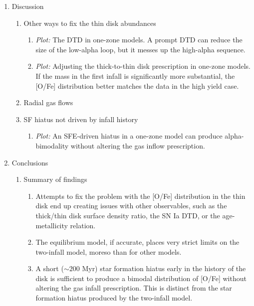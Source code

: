 \begin{enumerate}
    \item Discussion
    \begin{enumerate}
        \item Other ways to fix the thin disk abundances
        \begin{enumerate}
            \item {\it Plot:} The DTD in one-zone models. A prompt DTD can reduce the size of the low-alpha loop, but it messes up the high-alpha sequence.
            \item {\it Plot:} Adjusting the thick-to-thin disk prescription in one-zone models. If the mass in the first infall is significantly more substantial, the [O/Fe] distribution better matches the data in the high yield case.
        \end{enumerate}
        \item Radial gas flows
        \item SF hiatus not driven by infall history
        \begin{enumerate}
            \item {\it Plot:} An SFE-driven hiatus in a one-zone model can produce alpha-bimodality without altering the gas inflow prescription.
        \end{enumerate}
    \end{enumerate}
    
    \item Conclusions
    \begin{enumerate}
        \item Summary of findings
        \begin{enumerate}
            \item Attempts to fix the problem with the [O/Fe] distribution in the thin disk end up creating issues with other observables, such as the thick/thin disk surface density ratio, the SN Ia DTD, or the age-metallicity relation.
            \item The equilibrium model, if accurate, places very strict limits on the two-infall model, moreso than for other models.
            \item A short ($\sim200$ Myr) star formation hiatus early in the history of the disk is sufficient to produce a bimodal distribution of [O/Fe] without altering the gas infall prescription. This is distinct from the star formation hiatus produced by the two-infall model.
        \end{enumerate}
    \end{enumerate}
\end{enumerate}


